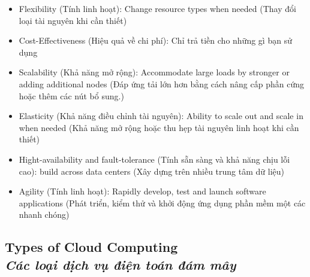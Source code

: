 \begin{itemize}
	\item Flexibility (Tính linh hoạt): Change resource types when needed (Thay đổi loại tài nguyên khi cần thiết)
	\item Cost-Effectiveness (Hiệu quả về chi phí): Chỉ trả tiền cho những gì bạn sử dụng
	\item Scalability (Khả năng mở rộng): Accommodate large loads by stronger or adding additional nodes (Đáp ứng tải lớn hơn bằng cách nâng cấp phần cứng hoặc thêm các nút bổ sung.)
	\item Elasticity (Khả năng điều chỉnh tài nguyên): Ability to scale out and scale in when needed (Khả năng mở rộng hoặc thu hẹp tài nguyên linh hoạt khi cần thiết)
	\item Hight-availability and fault-tolerance (Tính sẵn sàng và khả năng chịu lỗi cao): build across data centers (Xây dựng trên nhiều trung tâm dữ liệu)
	\item Agility (Tính linh hoạt): Rapidly develop, test and launch software applications (Phát triển, kiểm thử và khởi động ứng dụng phần mềm một các nhanh chóng)
\end{itemize}

\subsection[Types of Cloud Computing]{Types of Cloud Computing \\
	\textit{Các loại dịch vụ điện toán đám mây}}

